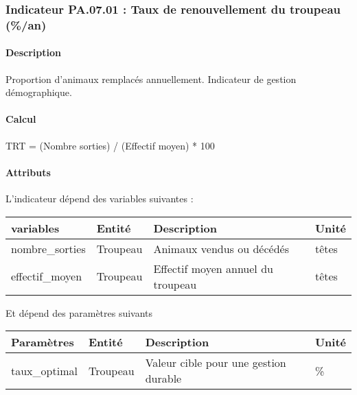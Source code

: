 \documentclass[
]{article}
\newenvironment{Shaded}{\begin{snugshade}}{\end{snugshade}}
\newcommand{\NormalTok}[1]{#1}
\begin{document}
\subsubsection{Indicateur PA.07.01 : Taux de renouvellement du troupeau
(\%/an)}\label{indicateur-pa.07.01-taux-de-renouvellement-du-troupeau-an}

\paragraph{Description}\label{description-6}

Proportion d'animaux remplacés annuellement. Indicateur de gestion
démographique.

\paragraph{Calcul}\label{calcul-6}

\begin{Shaded}
\begin{Highlighting}[]
\NormalTok{TRT = (Nombre sorties) / (Effectif moyen) * 100}
\end{Highlighting}
\end{Shaded}

\paragraph{Attributs}\label{attributs-24}

L'indicateur dépend des variables suivantes :

\begin{longtable}[]{@{}llll@{}}
\toprule\noalign{}
\textbf{variables} & \textbf{Entité} & \textbf{Description} &
\textbf{Unité} \\
\midrule\noalign{}
\endhead
\bottomrule\noalign{}
\endlastfoot
nombre\_sorties & Troupeau & Animaux vendus ou décédés & têtes \\
effectif\_moyen & Troupeau & Effectif moyen annuel du troupeau &
têtes \\
\end{longtable}

Et dépend des paramètres suivants

\begin{longtable}[]{@{}llll@{}}
\toprule\noalign{}
\textbf{Paramètres} & \textbf{Entité} & \textbf{Description} &
\textbf{Unité} \\
\midrule\noalign{}
\endhead
\bottomrule\noalign{}
\endlastfoot
taux\_optimal & Troupeau & Valeur cible pour une gestion durable & \% \\
\end{longtable}
\end{document}

